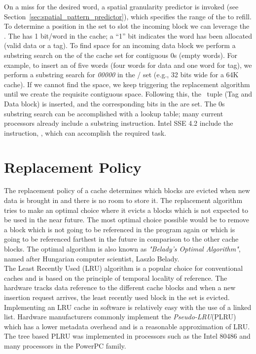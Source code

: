 On a miss for the desired word, a spatial granularity predictor is invoked (see Section~\ref{sec:spatial_pattern_predictor}), which specifies the range of the \AB{} to refill. To determine a position in the set to slot the incoming block we can leverage the . The  has 1 bit/word in the cache; a ``1'' bit indicates the word has been allocated (valid data or a tag). To find space for an incoming data block we perform a substring search on the  of the cache set for contiguous 0s (empty words). For example, to insert an \AB{} of five words (four words for data and one word for tag), we perform a substring search for \textit{00000} in the  / set (e.g., 32 bits wide for a 64K cache). If we cannot find the space, we keep triggering the replacement algorithm until we create the requisite contiguous space. Following this, the \AB\ tuple (Tag and Data block) is inserted, and the corresponding bits in the  are set. The 0s substring search can be accomplished with a lookup table; many current processors already include a substring instruction. Intel SSE 4.2 include the instruction, , which can accomplish the required task.

\section{Replacement Policy}

The replacement policy of a cache determines which blocks are evicted when new data is brought in and there is no room to store it. The replacement algorithm tries to make an optimal choice where it evicts a blocks which is not expected to be used in the near future. The most optimal choice possible would be to remove a block which is not going to be referenced in the program again or which is going to be referenced farthest in the future in comparison to the other cache blocks. The optimal algorithm is also known as \textit{"Belady's Optimal Algorithm"}, named after Hungarian computer scientist, Laszlo Belady.
\\

The Least Recently Used (LRU) algorithm is a popular choice for conventional caches and is based on the principle of temporal locality of reference. The hardware tracks data reference to the different cache blocks and when a new insertion request arrives, the least recently used block in the set is evicted. Implementing an LRU cache in software is relatively easy with the use of a linked list. Hardware manufacturers commonly implement the \textit{Pseudo-LRU}(PLRU) which has a lower metadata overhead and is a reasonable approximation of LRU. The tree based PLRU was implemented in processors such as the Intel 80486 and many processors in the PowerPC family. 

